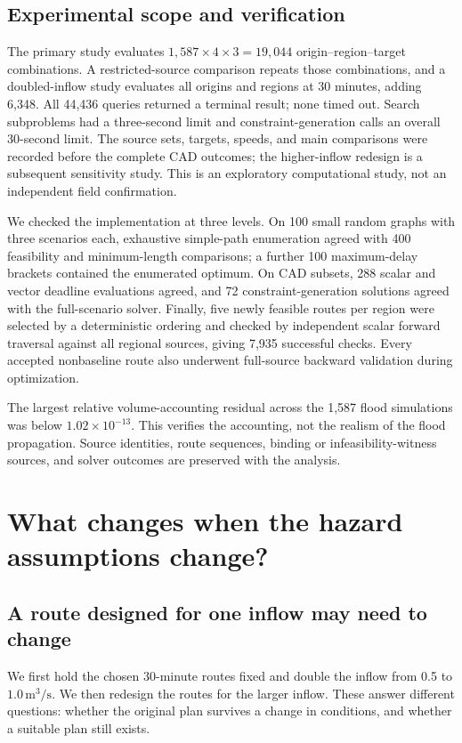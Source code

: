 \documentclass[11pt,a4paper]{article}
\begin{document}
\subsection{Experimental scope and verification}
The primary study evaluates $1{,}587\times4\times3=19{,}044$ origin--region--target combinations. A restricted-source comparison repeats those combinations, and a doubled-inflow study evaluates all origins and regions at 30 minutes, adding 6,348. All 44,436 queries returned a terminal result; none timed out. Search subproblems had a three-second limit and constraint-generation calls an overall 30-second limit. The source sets, targets, speeds, and main comparisons were recorded before the complete CAD outcomes; the higher-inflow redesign is a subsequent sensitivity study. This is an exploratory computational study, not an independent field confirmation.

We checked the implementation at three levels. On 100 small random graphs with three scenarios each, exhaustive simple-path enumeration agreed with 400 feasibility and minimum-length comparisons; a further 100 maximum-delay brackets contained the enumerated optimum. On CAD subsets, 288 scalar and vector deadline evaluations agreed, and 72 constraint-generation solutions agreed with the full-scenario solver. Finally, five newly feasible routes per region were selected by a deterministic ordering and checked by independent scalar forward traversal against all regional sources, giving 7,935 successful checks. Every accepted nonbaseline route also underwent full-source backward validation during optimization.

The largest relative volume-accounting residual across the 1,587 flood simulations was below $1.02\times10^{-13}$. This verifies the accounting, not the realism of the flood propagation. Source identities, route sequences, binding or infeasibility-witness sources, and solver outcomes are preserved with the analysis.

\section{What changes when the hazard assumptions change?}\label{sec:sensitivity}
\subsection{A route designed for one inflow may need to change}
We first hold the chosen 30-minute routes fixed and double the inflow from 0.5 to $1.0\,\mathrm{m^3/s}$. We then redesign the routes for the larger inflow. These answer different questions: whether the original plan survives a change in conditions, and whether a suitable plan still exists.
\end{document}
